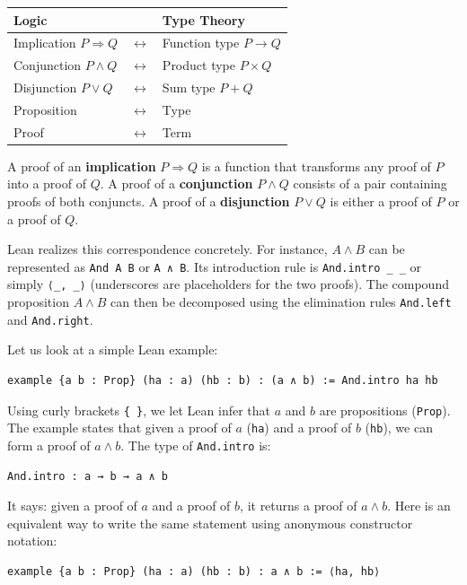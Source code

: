 \begin{center}
  \begin{tabular}{lll}
    \textbf{Logic}                &                       & \textbf{Type Theory}      \\
    \hline
    Implication $P \Rightarrow Q$ & $\longleftrightarrow$ & Function type $P \to Q$   \\
    Conjunction $P \land Q$       & $\longleftrightarrow$ & Product type $P \times Q$ \\
    Disjunction $P \lor Q$        & $\longleftrightarrow$ & Sum type $P + Q$          \\
    Proposition                   & $\longleftrightarrow$ & Type                      \\
    Proof                         & $\longleftrightarrow$ & Term                      \\
  \end{tabular}
\end{center}

\noindent
A proof of an \textbf{implication} $P \Rightarrow Q$ is a function
that transforms any proof of $P$ into a proof of $Q$.
A proof of a \textbf{conjunction} $P \land Q$ consists of a pair
containing proofs of both conjuncts.
A proof of a \textbf{disjunction} $P \lor Q$ is either a proof of
$P$ or a proof of $Q$.

Lean realizes this correspondence concretely.
For instance, $A \land B$ can be represented as
\lstinline[language=lean]|And A B| or \lstinline[language=lean]|A ∧ B|.
Its introduction rule is
\lstinline[language=lean]|And.intro _ _| or simply
\lstinline[language=lean]|⟨_, _⟩| (underscores are placeholders for
the two proofs).
The compound proposition $A \land B$ can then be decomposed using the
elimination rules
\lstinline[language=lean]|And.left| and
\lstinline[language=lean]|And.right|.

\begin{example}\label{ex:conj_intro_2}
  Let us look at a simple Lean example:
  \begin{lstlisting}[language=lean]
    example {a b : Prop} (ha : a) (hb : b) : (a ∧ b) := And.intro ha hb
  \end{lstlisting}
  Using curly brackets \lstinline[language=lean]|{ }|, we let Lean
  infer that $a$ and $b$ are propositions
  (\lstinline[language=lean]|Prop|).
  The example states that given a proof of $a$
  (\lstinline[language=lean]|ha|) and a proof of $b$
  (\lstinline[language=lean]|hb|), we can form a proof of
  $a \land b$.
  The type of \lstinline[language=lean]|And.intro| is:
  \begin{lstlisting}[language=lean]
    And.intro : a → b → a ∧ b
  \end{lstlisting}
  It says: given a proof of $a$ and a proof of $b$, it returns a
  proof of $a \land b$.
  Here is an equivalent way to write the same statement using
  anonymous constructor notation:
  \begin{lstlisting}[language=lean]
    example {a b : Prop} (ha : a) (hb : b) : a ∧ b := ⟨ha, hb⟩
  \end{lstlisting}
\end{example}


